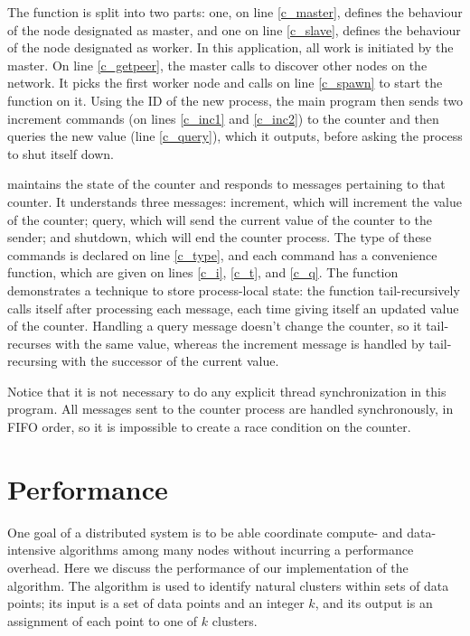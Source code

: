 \documentclass[preprint]{sigplanconf}
\begin{document}
The  function is split into two parts: one, on line \ref{c_master}, defines the behaviour of the node designated as master, and one on line \ref{c_slave}, defines the behaviour of the node designated as worker. 
In this application, all work is initiated by the master. On line \ref{c_getpeer}, the master calls  to discover other nodes on the network. It picks the first worker node and calls  on line \ref{c_spawn} to start the  function on it. Using the ID of the new process, the main program then sends two increment commands (on lines \ref{c_inc1} and \ref{c_inc2}) to the counter and then queries the new value (line \ref{c_query}), which it outputs, before asking the process to shut itself down.

 maintains the state of the counter and responds to messages pertaining to that counter. It understands three messages: increment, which will increment the value of the counter; query, which will send the current value of the counter to the sender; and shutdown, which will end the counter process. 
The type of these commands is declared on line \ref{c_type}, and each command has a convenience function, which are given on lines \ref{c_i}, \ref{c_t}, and \ref{c_q}. The  function demonstrates a technique to store process-local state: the function tail-recursively calls itself after processing each message, each time giving itself an updated value of the counter. Handling a query message doesn't change the counter, so it tail-recurses with the same value, whereas the increment message is handled by tail-recursing with the successor of the current value.

Notice that it is not necessary to do any explicit thread synchronization in this program. All messages sent to the counter process are handled synchronously, in FIFO order, so it is impossible to create a race condition on the counter.

\section{Performance}
\label{s:performance}

One goal of a distributed system is to be able coordinate compute- and data-intensive algorithms among many nodes without incurring a performance overhead. Here we discuss the performance of our implementation of the \kmeans{} algorithm. The algorithm is used to identify natural clusters within sets of data points; its input is a set of data points and an integer $k$, and its output is an assignment of each point to one of $k$ clusters.
\end{document}
